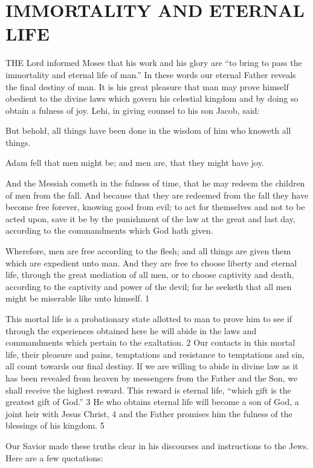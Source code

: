 \chapter{IMMORTALITY AND ETERNAL LIFE}

THE Lord informed Moses that his work and his glory are ``to bring to pass the immortality
and eternal life of man.'' In these words our eternal Father reveals the final destiny of man. It
is his great pleasure that man may prove himself obedient to the divine laws which govern
his celestial kingdom and by doing so obtain a fulness of joy. Lehi, in giving counsel to his
son Jacob, said:

But behold, all things have been done in the wisdom of him who knoweth all things.

Adam fell that men might be; and men are, that they might have joy.

And the Messiah cometh in the fulness of time, that he may redeem the children of men from
the fall. And because that they are redeemed from the fall they have become free forever,
knowing good from evil; to act for themselves and not to be acted upon, save it be by the
punishment of the law at the great and last day, according to the commandments which God
hath given.

Wherefore, men are free according to the flesh; and all things are given them which are
expedient unto man. And they are free to choose liberty and eternal life, through the great
mediation of all men, or to choose captivity and death, according to the captivity and power
of the devil; for he seeketh that all men might be miserable like unto himself. 1

This mortal life is a probationary state allotted to man to prove him to see if through the
experiences obtained here he will abide in the laws and commandments which pertain to the
exaltation. 2 Our contacts in this mortal life, their pleasure and pains, temptations and
resistance to temptations and sin, all count towards our final destiny. If we are willing to
abide in divine law as it has been revealed from heaven by messengers from the Father and
the Son, we shall receive the highest reward. This reward is eternal life, ``which gift is the
greatest gift of God.'' 3 He who obtains eternal life will become a son of God, a joint heir
with Jesus Christ, 4 and the Father promises him the fulness of the blessings of his kingdom.
5

Our Savior made these truths clear in his discourses and instructions to the Jews. Here are a
few quotations:

